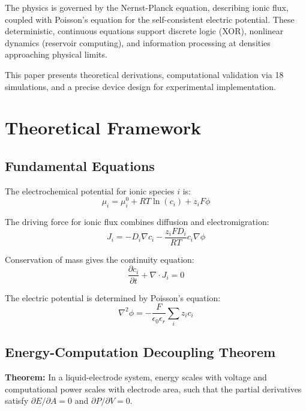 \documentclass[11pt]{article}
\begin{document}
The physics is governed by the Nernst-Planck equation, describing ionic flux, coupled with Poisson's equation for the self-consistent electric potential. These deterministic, continuous equations support discrete logic (XOR), nonlinear dynamics (reservoir computing), and information processing at densities approaching physical limits.

This paper presents theoretical derivations, computational validation via 18 simulations, and a precise device design for experimental implementation.

\section{Theoretical Framework}

\subsection{Fundamental Equations}

The electrochemical potential for ionic species $i$ is:
\begin{equation}
\mu_i = \mu_i^0 + RT \ln(c_i) + z_i F \phi
\end{equation}

The driving force for ionic flux combines diffusion and electromigration:
\begin{equation}
J_i = -D_i \nabla c_i - \frac{z_i F D_i}{RT} c_i \nabla \phi
\end{equation}

Conservation of mass gives the continuity equation:
\begin{equation}
\frac{\partial c_i}{\partial t} + \nabla \cdot J_i = 0
\end{equation}

The electric potential is determined by Poisson's equation:
\begin{equation}
\nabla^2 \phi = -\frac{F}{\epsilon_0 \epsilon_r} \sum_i z_i c_i
\end{equation}

\subsection{Energy-Computation Decoupling Theorem}

\textbf{Theorem:} In a liquid-electrode system, energy scales with voltage and computational power scales with electrode area, such that the partial derivatives satisfy $\partial E / \partial A = 0$ and $\partial P / \partial V = 0$.
\end{document}
